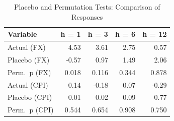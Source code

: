 \begin{table}[ht]
\centering
\caption{Placebo and Permutation Tests: Comparison of Responses} 
\label{tab:placebo_results}
\begin{tabular}{lrrrr}
  \toprule
Variable & h = 1 & h = 3 & h = 6 & h = 12 \\ 
  \midrule
Actual (FX) & 4.53 & 3.61 & 2.75 & 0.57 \\ 
  Placebo (FX) & -0.57 & 0.97 & 1.49 & 2.06 \\ 
  Perm.~p (FX) & 0.018 & 0.116 & 0.344 & 0.878 \\ 
  Actual (CPI) & 0.14 & -0.18 & 0.07 & -0.29 \\ 
  Placebo (CPI) & 0.01 & 0.02 & 0.09 & 0.77 \\ 
  Perm.~p (CPI) & 0.544 & 0.654 & 0.908 & 0.750 \\ 
   \bottomrule
\end{tabular}
\end{table}
